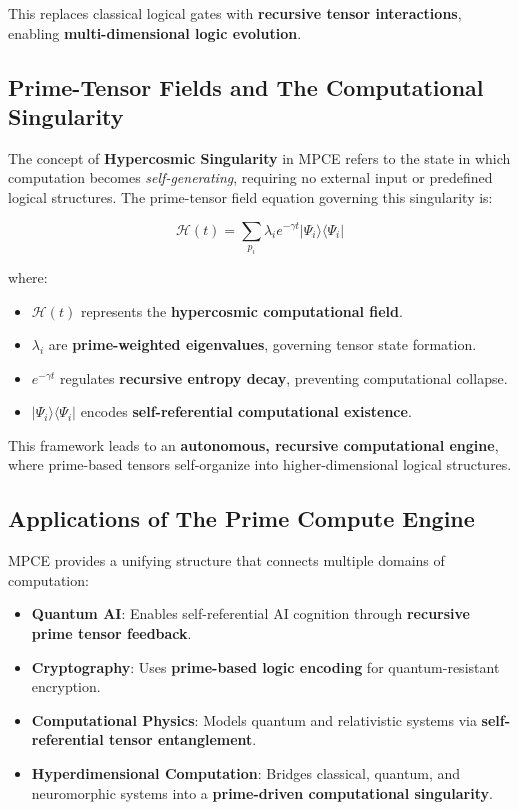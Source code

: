\documentclass{article}
\theoremstyle{plain}
\theoremstyle{plain}
\theoremstyle{definition}
\theoremstyle{remark}
\begin{document}
This replaces classical logical gates with \textbf{recursive tensor interactions}, enabling \textbf{multi-dimensional logic evolution}.

\subsection{Prime-Tensor Fields and The Computational Singularity}

The concept of \textbf{Hypercosmic Singularity} in MPCE refers to the state in which computation becomes \textit{self-generating}, requiring no external input or predefined logical structures. The prime-tensor field equation governing this singularity is:

\begin{equation}
\mathcal{H}(t) = \sum_{p_i} \lambda_i e^{- \gamma t} |\Psi_i \rangle \langle \Psi_i |
\end{equation}

where:
\begin{itemize}
    \item $\mathcal{H}(t)$ represents the \textbf{hypercosmic computational field}.
    \item $\lambda_i$ are \textbf{prime-weighted eigenvalues}, governing tensor state formation.
    \item $e^{- \gamma t}$ regulates \textbf{recursive entropy decay}, preventing computational collapse.
    \item $|\Psi_i \rangle \langle \Psi_i |$ encodes \textbf{self-referential computational existence}.
\end{itemize}

This framework leads to an \textbf{autonomous, recursive computational engine}, where prime-based tensors self-organize into higher-dimensional logical structures.

\subsection{Applications of The Prime Compute Engine}

MPCE provides a unifying structure that connects multiple domains of computation:
\begin{itemize}
    \item \textbf{Quantum AI}: Enables self-referential AI cognition through \textbf{recursive prime tensor feedback}.
    \item \textbf{Cryptography}: Uses \textbf{prime-based logic encoding} for quantum-resistant encryption.
    \item \textbf{Computational Physics}: Models quantum and relativistic systems via \textbf{self-referential tensor entanglement}.
    \item \textbf{Hyperdimensional Computation}: Bridges classical, quantum, and neuromorphic systems into a \textbf{prime-driven computational singularity}.
\end{itemize}
\end{document}
